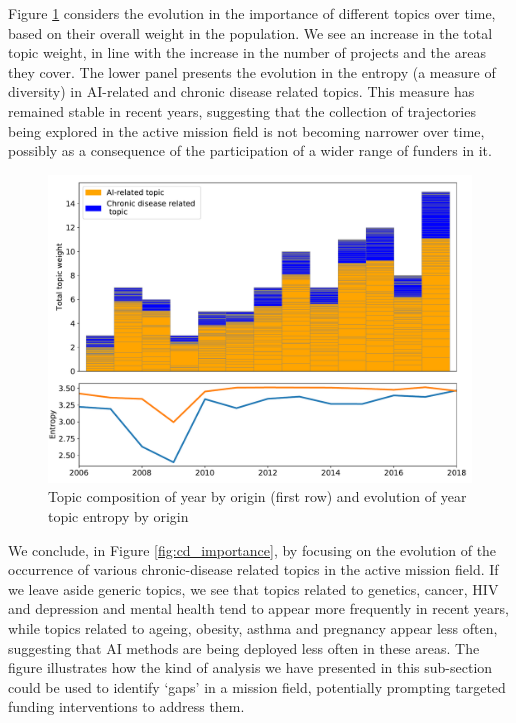 \documentclass[11pt]{article}
\begin{document}
Figure \ref{fig:topic_evol} considers the evolution in the importance of different topics over time, based on their overall weight in the population. We see an increase in the total topic weight, in line with the increase in the number of projects and the areas they cover. The lower panel presents the evolution in the entropy (a measure of diversity) in AI-related and chronic disease related topics. This measure has remained stable in recent years, suggesting that the collection of trajectories being explored in the active mission field is not becoming narrower over time, possibly as a consequence of the participation of a wider range of funders in it.

\begin{figure}[!ht]
    \centering
    \includegraphics[width=\textwidth]{figures/fig_20_topic_trends.pdf}
    \caption{Topic composition of year by origin (first row) and evolution of year topic entropy by origin}
    \label{fig:topic_evol}
\end{figure}

We conclude, in Figure \ref{fig:cd_importance}, by focusing on the evolution of the occurrence of various chronic-disease related topics in the active mission field. If we leave aside generic topics, we see that topics related to genetics, cancer, HIV and depression and mental health tend to appear more frequently in recent years, while topics related to ageing, obesity, asthma and pregnancy appear less often, suggesting that AI methods are being deployed less often in these areas. The figure illustrates how the kind of analysis we have presented in this sub-section could be used to identify `gaps' in a mission field, potentially prompting targeted funding interventions to address them. 
\end{document}
